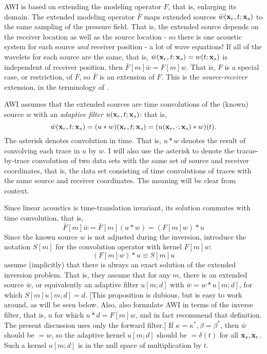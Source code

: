 AWI is based on extending the modeling operator $F$, that is, enlarging its domain.
The extended modeling operator ${\bar F}$ maps extended sources
$\bar{w}({\bf x}_r,t;{\bf x}_s)$ to the same sampling of the pressure
field. That is, the extended source depends on the receiver location
as well as the source location - so there is one acoustic system for
each source {\em and} receiver position - a lot of wave equations! If all
of the wavelets for each source are the same, that is, ${\bar w}({\bf
  x}_r,t;{\bf x}_s) = w(t;{\bf x}_s)$ is independent of receiver
position, then ${\bar F}[m]\bar{w} = F[m]w$. That is, $F$ is a special
case, or restriction, of ${\bar F}$, so ${\bar F}$ is an extension of
$F$. This is the {\em source-receiver} extension, in the terminology of \cite{HuangSymes2015SEG}.

AWI assumes that the extended sources are time convolutions of the
(known) source $w$ with an {\em adaptive filter} $u({\bf
  x}_r,t;{\bf x}_s)$: that is,
\[
  \bar{w}({\bf x}_r,t;{\bf x}_s) = (u * w)({\bf  x}_r,t;{\bf x}_s)
  = (u({\bf  x}_r,\cdot;{\bf x}_s)*w)(t).
\]
The asterisk denotes convolution in time. That is,
$u*w$ denotes the result of convolving each trace in $u$ by $w$. I
will also use the asterisk to denote the tracae-by-trace convolution
of two data sets with the same set of source and receiver coordinates,
that is, the data set consisting of time convolutions of traces with the same source
and receiver coordinates. The meaning will be clear from context.

Since linear acoustics is time-translation invariant, its solution commutes with time convolution, that is,
\[
 \bar{F}[m]\bar{w} = \bar{F}[m](u* w) = (F[m]w)*u
\]
Since the known source $w$ is not adjusted during the inversion, 
introduce the notation $S[m]$ for the convolution operator with kernel $F[m]w$:
\begin{equation}
  \label{eqn:sdef}
  (F[m]w)*u \equiv S[m]u
\end{equation}
\cite{Warner:16} assume (implicitly) that there is always an exact
solution of the extended inversion problem. That is, they assume that
for any $m$, there is an extended source $\bar{w}$, or equivalently an
adaptive filter $u[m;d]$ with $\bar{w}=w*u[m;d]$, for which
$S[m]u[m;d]= d$. [This proposition is dubious, but is easy to work
around, as will be seen below. Also, \cite{Warner:16} also formulate
AWI in terms of the inverse filter, that is, $u$ for which
$u*d = F[m]w$, and in fact recommend that definition. The present
discussion uses only the forward filter.] If
$\kappa = \kappa^*, \beta = \beta^*$, then $\bar{w}$ should be $= w$,
so the adaptive kernel $u[m;d]$ should be $=\delta(t)$ for all
${\bf x}_s,{\bf x}_r$. Such a kernel $u[m;d]$ is in the null space of
multiplication by $t$.

